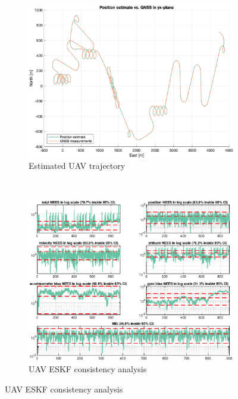 \begin{figure}[ht]
    \centering
	\begin{subfigure}[b]{0.45\textwidth}
		\includegraphics[width=\textwidth]{figures/ga_2/sim_trajectory.eps}
    \caption{Estimated UAV trajectory}
    \label{fig:ga_2_sim_trajectory}
	\end{subfigure}%
       ~
	\begin{subfigure}[b]{0.45\textwidth}
		\includegraphics[width=\textwidth]{figures/ga_2/sim_consistency.eps}
    \caption{UAV ESKF consistency analysis}
    \label{fig:ga_2_sim_consistency}
	\end{subfigure}
    \label{fig:ga_2_sim_trajectory_consistency} 
\end{figure}

